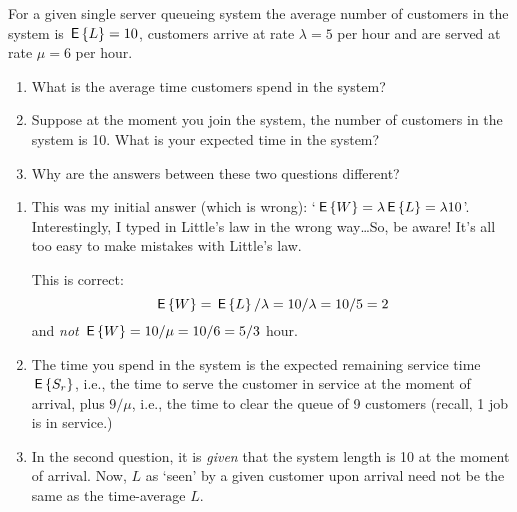 \begin{question}
  For a given single server queueing system the average number of
  customers in the system is $\,\mathsf{E}\left\{L\right\} = 10$, customers arrive at rate
  $\lambda=5$ per hour and are served at rate $\mu=6$ per hour.
  \begin{enumerate}
  \item What is the average time customers spend in the system?
  \item Suppose at the moment you join the system, the number of
    customers in the system is 10. What is your expected time in the
    system? 
  \item Why are the answers between these two questions different?
  \end{enumerate}
  \begin{hint}
    
  \end{hint}

    \begin{solution}
      \begin{enumerate}
      \item This was my initial answer (which is wrong):
        `$\,\mathsf{E}\left\{W\right\} = \lambda \,\mathsf{E}\left\{L\right\} = \lambda 10$'.  Interestingly, I typed
        in Little's law in the wrong way\ldots So, be aware! It's all
        too easy to make mistakes with Little's law.

    This is correct: 
    \begin{equation*}
      \,\mathsf{E}\left\{W\right\} = \,\mathsf{E}\left\{L\right\}/\lambda = 10/\lambda = 10/5 = 2
    \end{equation*}
    and \emph{not} $\,\mathsf{E}\left\{W\right\} = 10/\mu=10/6=5/3$ hour.
  \item The time you spend in the system is the expected remaining
    service time $\,\mathsf{E}\left\{S_r\right\}$, i.e., the time to serve the customer in
    service at the moment of arrival, plus $9/\mu$, i.e., the time to
    clear the queue of 9 customers (recall, 1 job is in service.)
  \item In the second question, it is \emph{given} that the system
    length is 10 at the moment of arrival. Now, $L$ as `seen' by a
    given customer upon arrival need not be the same as the
    time-average $L$.
  \end{enumerate}
    \end{solution}
\end{question}

